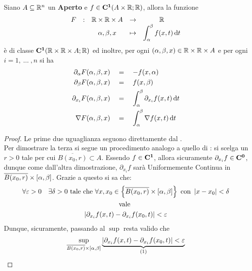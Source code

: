 \begin{proposition}
	\label{prop:f_C1_allora_F_C1}
	Siano $A \subseteq \mathbb{R}^n$ un \textbf{Aperto} e $f \in \mathbf{C^{1}}(A \times \mathbb{R};\mathbb{R})$, allora la funzione
	\[\begin{array}{ccccc} {F} & : & {\mathbb{R} \times \mathbb{R} \times A} & \to & {\mathbb{R}} \\ & & {\alpha, \beta, x} & \mapsto & {\displaystyle\int_{\alpha}^{\beta} f(x,t)\,\mathrm{d}{t}} \\ \end{array}\]
	è di classe $\mathbf{C^{1}}(\mathbb{R} \times \mathbb{R} \times A;\mathbb{R})$ ed inoltre, per ogni $(\alpha, \beta, x) \in \mathbb{R} \times \mathbb{R} \times A$ e per ogni $i = 1,\:\dotsc\:,n$ si ha
	\begin{align*}
		\partial_\alpha F(\alpha, \beta, x) \quad &= \quad -f(x, \alpha)\\
		\partial_\beta F(\alpha, \beta, x) \quad &= \quad f(x, \beta)\\
		\partial_{x_i} F(\alpha, \beta, x) \quad &= \quad \int_{\alpha}^{\beta} \partial_{x_i} f(x,t) \,\mathrm{d}{t}\\
		\nabla F(\alpha, \beta, x) \quad &= \quad \int_{\alpha}^{\beta} \nabla f(x,t) \,\mathrm{d}{t}
	\end{align*}
	\begin{proof}
		Le prime due uguaglianza seguono direttamente dal .\\
		Per dimostrare la terza si segue un procedimento analogo a quello di : si scelga un $r > 0$ tale per cui $\overline{B(x_0, r)} \subset A$. Essendo $f \in \mathbf{C^{1}}$, allora sicuramente $\partial_{x_i} f \in \mathbf{C^{0}}$, dunque come dall'altra dimostrazione, $\partial_{x_i} f$ sarà Uniformemente Continua in $\overline{B(x_0, r)} \times \left[\alpha,\beta\right]$. Grazie a questo si sa che:
		\[
			\begin{gathered}
				\forall \varepsilon > 0 \quad \exists \delta > 0 \text{ tale che } \forall x,x_0 \in \left\{\overline{B(x_0, r)} \times \left[\alpha,\beta\right]\right\} \text{ con } \left|x - x_0\right| < \delta\\
				\text{vale }\\
				\left|\partial_{x_i} f(x, t) - \partial_{x_i} f(x_0, t)\right| < \varepsilon
			\end{gathered}
		\]
		Dunque, sicuramente, passando al $\sup$ resta valido che
		\begin{equation}
			\label{eq:deriv_integ_F_alfa_beta_C1}
			\sup\limits_{\overline{B(x_0, r)} \times \intervalclose{\alpha}{\beta}} \underbrace{\abs{\partial_{x_i} f(x, t) - \partial_{x_i} f(x_0, t)} < \varepsilon}_{\text{(1)}}

\end{equation}
\end{proof}
\end{proposition}
